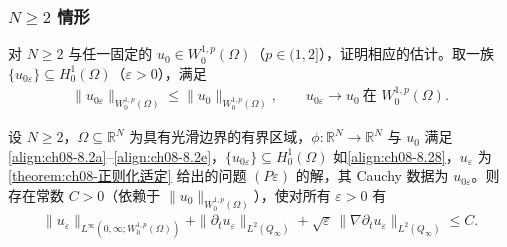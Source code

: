\documentclass[../../main.tex]{subfiles}%
\begin{document}
\subsubsection{$N\geqslant2$ 情形}\label{subsubsection:ch08-N2估计}

对 $N\geqslant2$ 与任一固定的 $u_0\in W^{1,p}_0(\Omega)$（$p\in(1,2]$），证明相应的估计。取一族 $\{u_{0\varepsilon}\}\subseteq H^1_0(\Omega)$（$\varepsilon>0$），满足
\begin{align}
\|u_{0\varepsilon}\|_{W^{1,p}_0(\Omega)}\leqslant\|u_0\|_{W^{1,p}_0(\Omega)},\qquad
u_{0\varepsilon}\to u_0\ \text{在 }W^{1,p}_0(\Omega). \label{align:ch08-8.28}
\end{align}

\begin{proposition}\label{proposition:ch08-先验估计N2}
设 $N\geqslant2$，$\Omega\subseteq\mathbb{R}^N$ 为具有光滑边界的有界区域，$\phi:\mathbb{R}^N\to\mathbb{R}^N$ 与 $u_0$ 满足\eqref{align:ch08-8.2a}--\eqref{align:ch08-8.2e}，$\{u_{0\varepsilon}\}\subseteq H^1_0(\Omega)$ 如\eqref{align:ch08-8.28}，$u_\varepsilon$ 为\cref{theorem:ch08-正则化适定} 给出的问题 $(P\varepsilon)$ 的解，其 Cauchy 数据为 $u_{0\varepsilon}$。则存在常数 $C>0$（依赖于 $\|u_0\|_{W^{1,p}_0(\Omega)}$），使对所有 $\varepsilon>0$ 有
\begin{align}
\|u_\varepsilon\|_{L^\infty(0,\infty;W^{1,p}_0(\Omega))}
+\|\partial_t u_\varepsilon\|_{L^2(Q_\infty)}
+\sqrt{\varepsilon}\,\|\nabla\partial_t u_\varepsilon\|_{L^2(Q_\infty)}\leqslant C. \label{align:ch08-8.29}
\end{align}
\end{proposition}
\end{document}
